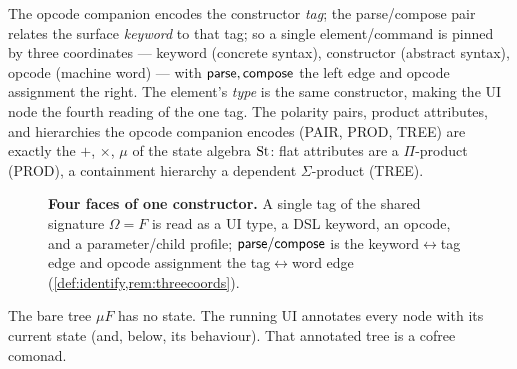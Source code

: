 \documentclass[../uxoxo-main]{subfiles}
\begin{document}
\begin{remark}\label{rem:threecoords}
The opcode companion encodes the constructor \emph{tag}; the parse/compose pair
relates the surface \emph{keyword} to that tag; so a single element/command is
pinned by three coordinates --- keyword (concrete syntax), constructor (abstract
syntax), opcode (machine word) --- with $\mathsf{parse},\mathsf{compose}$ the left edge and
opcode assignment the right. The element's \emph{type} is the same constructor,
making the UI node the fourth reading of the one tag. The polarity pairs, product
attributes, and hierarchies the opcode companion encodes (\textsf{PAIR},
\textsf{PROD}, \textsf{TREE}) are exactly the $+$, $\times$, $\mu$ of the state
algebra $\mathrm{St}$: flat attributes are a $\Pi$-product (\textsf{PROD}), a containment
hierarchy a dependent $\Sigma$-product (\textsf{TREE}).
\end{remark}

\begin{figure}[H]
\centering
{}
\caption{\textbf{Four faces of one constructor.} A single tag of the shared
signature $\Omega=F$ is read as a UI type, a DSL keyword, an opcode, and a
parameter/child profile; $\mathsf{parse}/\mathsf{compose}$ is the keyword$\leftrightarrow$tag
edge and opcode assignment the tag$\leftrightarrow$word edge
(\cref{def:identify,rem:threecoords}).}
\label{fig:faces}
\end{figure}
The bare tree $\mu F$ has no state. The running UI annotates every node with its
current state (and, below, its behaviour). That annotated tree is a cofree
comonad.
\end{document}
